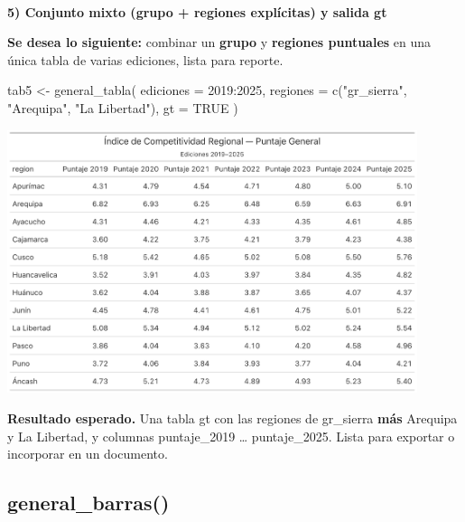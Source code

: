 \documentclass[
  11pt,
  letterpaper,
  DIV=11,
  numbers=noendperiod]{scrartcl}
\makeatletter
\let\oldparagraph\paragraph
\renewcommand{\paragraph}{
    \@ifstar
      \xxxParagraphStar
      \xxxParagraphNoStar
  }
\newcommand{\xxxParagraphStar}[1]{\oldparagraph*{#1}\mbox{}}
\newcommand{\xxxParagraphNoStar}[1]{\oldparagraph{#1}\mbox{}}
\newenvironment{Shaded}{\begin{snugshade}}{\end{snugshade}}
\newcommand{\AttributeTok}[1]{\textcolor[rgb]{0.40,0.45,0.13}{#1}}
\newcommand{\ConstantTok}[1]{\textcolor[rgb]{0.56,0.35,0.01}{#1}}
\newcommand{\DecValTok}[1]{\textcolor[rgb]{0.68,0.00,0.00}{#1}}
\newcommand{\FunctionTok}[1]{\textcolor[rgb]{0.28,0.35,0.67}{#1}}
\newcommand{\NormalTok}[1]{\textcolor[rgb]{0.00,0.23,0.31}{#1}}
\newcommand{\OtherTok}[1]{\textcolor[rgb]{0.00,0.23,0.31}{#1}}
\newcommand{\SpecialCharTok}[1]{\textcolor[rgb]{0.37,0.37,0.37}{#1}}
\newcommand{\StringTok}[1]{\textcolor[rgb]{0.13,0.47,0.30}{#1}}
\makeatother
\begin{document}
\paragraph{\texorpdfstring{\textbf{5) Conjunto mixto (grupo + regiones
explícitas) y salida
gt}}{5) Conjunto mixto (grupo + regiones explícitas) y salida gt}}\label{conjunto-mixto-grupo-regiones-expluxedcitas-y-salida-gt}

\textbf{Se desea lo siguiente:} combinar un \textbf{grupo} y
\textbf{regiones puntuales} en una única tabla de varias ediciones,
lista para reporte.

\begin{Shaded}
\begin{Highlighting}[]
\NormalTok{tab5 }\OtherTok{\textless{}{-}} \FunctionTok{general\_tabla}\NormalTok{(}
  \AttributeTok{ediciones =} \DecValTok{2019}\SpecialCharTok{:}\DecValTok{2025}\NormalTok{,}
  \AttributeTok{regiones  =} \FunctionTok{c}\NormalTok{(}\StringTok{"gr\_sierra"}\NormalTok{, }\StringTok{"Arequipa"}\NormalTok{, }\StringTok{"La Libertad"}\NormalTok{),}
  \AttributeTok{gt        =} \ConstantTok{TRUE}
\NormalTok{)}
\end{Highlighting}
\end{Shaded}

\begin{center}
\includegraphics[width=0.9\textwidth,height=\textheight]{obal.png}
\end{center}

\textbf{Resultado esperado.} Una tabla gt con las regiones de gr\_sierra
\textbf{más} Arequipa y La Libertad, y columnas puntaje\_2019 \ldots{}
puntaje\_2025. Lista para exportar o incorporar en un documento.

\subsection{\texorpdfstring{\textbf{general\_barras()}}{general\_barras()}}\label{general_barras}
\end{document}
